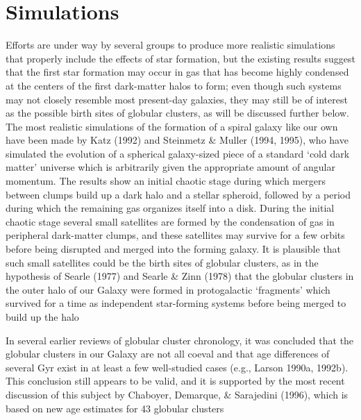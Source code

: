 \section{Simulations}

Efforts are under way by several groups to produce more realistic simulations that properly include the effects
of star formation, but the existing results suggest that the first star formation may occur in gas that has become highly condensed at the centers of the first dark-matter halos to form; even though such systems may not closely resemble most present-day galaxies, they may still be of interest as the possible birth sites
of globular clusters, as will be discussed further below. The most realistic simulations of the formation of a spiral galaxy like our own have been made by Katz (1992) and Steinmetz \& Muller (1994, 1995), who have simulated the evolution of a spherical galaxy-sized piece of a standard ‘cold dark matter’ universe which is arbitrarily given the appropriate amount of angular momentum. The results show an initial chaotic stage during which mergers between clumps build up a dark halo and a stellar spheroid, followed by a period during which the remaining gas organizes itself into a disk. During the initial chaotic stage several small satellites are formed by the condensation of gas in peripheral dark-matter clumps, and these satellites may survive for a few
orbits before being disrupted and merged into the forming galaxy. It is plausible that such small satellites could be the birth sites of globular clusters, as in the hypothesis of Searle (1977) and Searle \& Zinn (1978) that the globular clusters in the outer halo of our Galaxy were formed in protogalactic ‘fragments’ which
survived for a time as independent star-forming systems before being merged to build up the halo

In several earlier reviews of globular cluster chronology, it was concluded that the globular clusters in our Galaxy are not all coeval and that age differences of several Gyr exist in at least a few well-studied cases (e.g., Larson 1990a, 1992b). This conclusion still appears to be valid, and it is supported by the most recent discussion of this subject by Chaboyer, Demarque, \& Sarajedini (1996), which is based on new age estimates for 43 globular clusters


